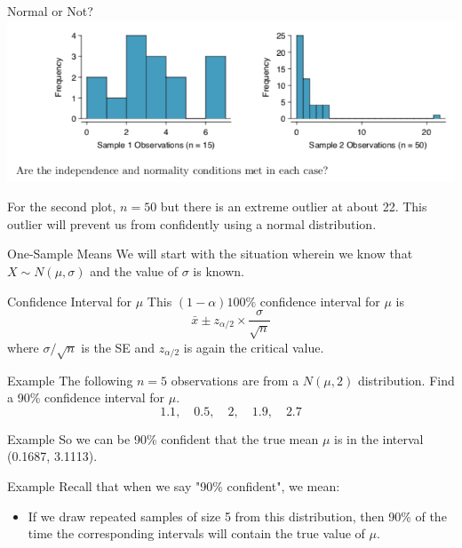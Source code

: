 \begin{frame}{Normal or Not?}
    \includegraphics[scale=0.4]{images/normalorno.png}
    
    For the second plot, $n=50$ but there is an extreme outlier at about 22. This outlier will prevent us from confidently using a normal distribution. 
\end{frame}

\begin{frame}{One-Sample Means}
    We will start with the situation wherein we know that $X\sim N(\mu, \sigma)$ and the value of $\sigma$ is known.
\end{frame}

\begin{frame}{Confidence Interval for $\mu$}
    This $(1-\alpha)100\%$ confidence interval for $\mu$ is
    \[
       \bar{x} \pm z_{\alpha/2}\times\frac{\sigma}{\sqrt{n}} 
    \]
    where $\sigma/\sqrt{n}$ is the SE and $z_{\alpha/2}$ is again the critical value.
\end{frame}

\begin{frame}{Example}
    The following $n=5$ observations are from a $N(\mu, 2)$ distribution. Find a 90\% confidence interval for $\mu$.
    \[
        1.1, \quad 0.5, \quad 2, \quad 1.9, \quad 2.7
    \]
\end{frame}

\begin{frame}{Example}
    So we can be 90\% confident that the true mean $\mu$ is in the interval (0.1687, 3.1113). 
\end{frame}

\begin{frame}{Example}
    Recall that when we say "90\% confident", we mean:
    \begin{itemize}
        \item If we draw repeated samples of size 5 from this distribution, then 90\% of the time the corresponding intervals will contain the true value of $\mu$.
    \end{itemize}
\end{frame}

